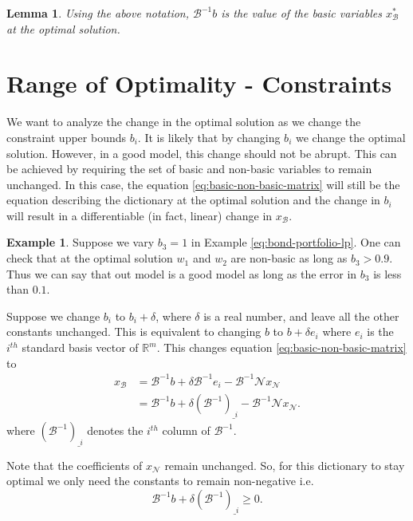 \documentclass[
]{book}
\newtheorem{lemma}{Lemma}[chapter]
\theoremstyle{definition}
\theoremstyle{definition}
\newtheorem{example}{Example}[chapter]
\theoremstyle{definition}
\theoremstyle{definition}
\theoremstyle{remark}
\begin{document}
\begin{lemma}
\protect\hypertarget{lem:basic-values}{}\label{lem:basic-values}Using the above notation, \(\mathcal{B}^{-1}b\) is the value of the basic variables \(x^*_{\mathcal{B}}\) at the optimal solution.
\end{lemma}

\hypertarget{range-of-optimality---constraints}{%
\section{Range of Optimality - Constraints}\label{range-of-optimality---constraints}}

We want to analyze the change in the optimal solution as we change the constraint upper bounds \(b_i\).
It is likely that by changing \(b_i\) we change the optimal solution.
However, in a good model, this change should not be abrupt.
This can be achieved by requiring the set of basic and non-basic variables to remain unchanged.
In this case, the equation \eqref{eq:basic-non-basic-matrix} will still be the equation describing the dictionary at the optimal solution and the change in \(b_i\) will result in a differentiable (in fact, linear) change in \(x_{\mathcal{B}}\).

\begin{example}
Suppose we vary \(b_3 = 1\) in Example \eqref{eq:bond-portfolio-lp}. One can check that at the optimal solution \(w_1\) and \(w_2\) are non-basic as long as \(b_3 > 0.9\). Thus we can say that out model is a good model as long as the error in \(b_3\) is less than \(0.1\).
\end{example}

Suppose we change \(b_i\) to \(b_i + \delta\), where \(\delta\) is a real number, and leave all the other constants unchanged. This is equivalent to changing \(b\) to \(b + \delta e_i\) where \(e_i\) is the \(i^{th}\) standard basis vector of \(\mathbb{R}^m\). This changes equation \eqref{eq:basic-non-basic-matrix} to
\begin{align*}
  x_{\mathcal{B}} 
    &= \mathcal{B}^{-1} b + \delta \mathcal{B}^{-1} e_i - \mathcal{B}^{-1} \mathcal{N} x_{\mathcal{N}} \\
    &= \mathcal{B}^{-1} b + \delta (\mathcal{B}^{-1})_{\_i} - \mathcal{B}^{-1} \mathcal{N} x_{\mathcal{N}}.
\end{align*}
where \((\mathcal{B}^{-1})_{\_i}\) denotes the \(i^{th}\) column of \(\mathcal{B}^{-1}\).

Note that the coefficients of \(x_{\mathcal{N}}\) remain unchanged. So, for this dictionary to stay optimal we only need the constants to remain non-negative i.e.
\begin{equation}
  \mathcal{B}^{-1} b + \delta (\mathcal{B}^{-1})_{\_i} \ge 0.
  \label{eq:range-of-optimality}
\end{equation}
\end{document}
